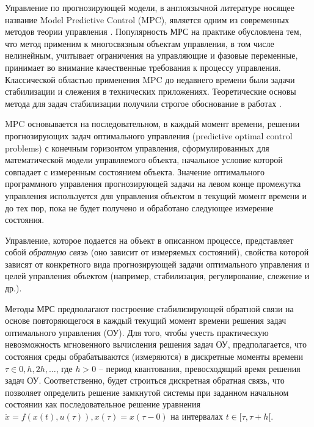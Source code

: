 Управление по прогнозирующей модели, в англоязычной литературе носящее название Model Predictive Control (MPC), является одним из современных методов теории управления \cite{mpcIn, mpcIn2}. Популярность МРС на практике обусловлена тем, что метод применим к многосвязным объектам управления, в том числе нелинейным, учитывает ограничения на управляющие и фазовые переменные, принимает во внимание качественные требования к процессу
управления. Классической областью применения MPC до недавнего времени были задачи стабилизации и слежения в технических приложениях. Теоретические основы метода для задач стабилизации получили строгое обоснование в работах \cite{mpcIn, mpcIn2}.



MPC основывается на последовательном, в каждый момент времени, решении прогнозирующих задач оптимального управления (predictive optimal control problems) с конечным горизонтом управления, сформулированных для математической модели управляемого объекта, начальное условие которой совпадает с измеренным состоянием объекта. Значение оптимального программного управления прогнозирующей задачи на левом конце промежутка управления используется для управления объектом в текущий момент времени и до тех пор, пока не будет получено и обработано следующее измерение состояния.

Управление, которое подается на объект в описанном процессе, представляет собой \textit{обратную связь} (оно зависит от измеряемых состояний), свойства которой зависят от конкретного вида прогнозирующей задачи оптимального управления и целей управления объектом (например, стабилизация, регулирование, слежение и др.).

Методы МРС предполагают построение стабилизирующей обратной связи на основе повторяющегося в каждый текущий момент времени решения задач оптимального управления (ОУ)\cite{mpc}. Для того, чтобы учесть практическую невозможность мгновенного вычисления решения задач ОУ, предполагается, что состояния среды обрабатываются (измеряются) в дискретные моменты времени $\tau \in {0, h, 2h, \dots}$, где $h > 0$ – период квантования,
превосходящий время решения задач ОУ. Соответственно, будет строиться дискретная обратная связь, что позволяет определить решение замкнутой системы при заданном начальном состоянии как последовательное решение уравнения
$\ddot{x} = f(x(t), u(\tau)), x(\tau) = x(\tau - 0) $ на интервалах $t \in [\tau, \tau + h[$.


